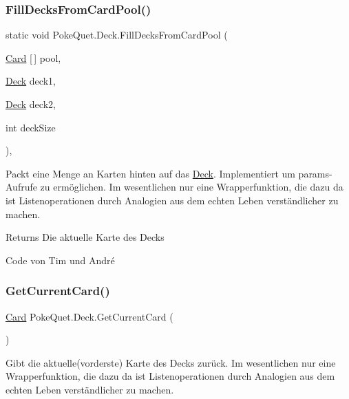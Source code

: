 \subsubsection{\texorpdfstring{Fill\+Decks\+From\+Card\+Pool()}{FillDecksFromCardPool()}}
{\footnotesize\ttfamily static void Poke\+Quet.\+Deck.\+Fill\+Decks\+From\+Card\+Pool (\begin{DoxyParamCaption}\item[{\mbox{\hyperlink{class_poke_quet_1_1_card}{Card}} \mbox{[}$\,$\mbox{]}}]{pool,  }\item[{\mbox{\hyperlink{class_poke_quet_1_1_deck}{Deck}}}]{deck1,  }\item[{\mbox{\hyperlink{class_poke_quet_1_1_deck}{Deck}}}]{deck2,  }\item[{int}]{deck\+Size }\end{DoxyParamCaption})\hspace{0.3cm}{\ttfamily [inline]}, {\ttfamily [static]}}



Packt eine Menge an Karten hinten auf das \mbox{\hyperlink{class_poke_quet_1_1_deck}{Deck}}. Implementiert um params-\/\+Aufrufe zu ermöglichen. Im wesentlichen nur eine Wrapperfunktion, die dazu da ist Listenoperationen durch Analogien aus dem echten Leben verständlicher zu machen. 

\begin{DoxyReturn}{Returns}
Die aktuelle Karte des Decks
\end{DoxyReturn}


Code von Tim und André\mbox{\label{class_poke_quet_1_1_deck_a54d648dd64cb769d6817cc4bcf0e9af2}} 
\subsubsection{\texorpdfstring{Get\+Current\+Card()}{GetCurrentCard()}}
{\footnotesize\ttfamily \mbox{\hyperlink{class_poke_quet_1_1_card}{Card}} Poke\+Quet.\+Deck.\+Get\+Current\+Card (\begin{DoxyParamCaption}{ }\end{DoxyParamCaption})\hspace{0.3cm}{\ttfamily [inline]}}



Gibt die aktuelle(vorderste) Karte des Decks zurück. Im wesentlichen nur eine Wrapperfunktion, die dazu da ist Listenoperationen durch Analogien aus dem echten Leben verständlicher zu machen. 

